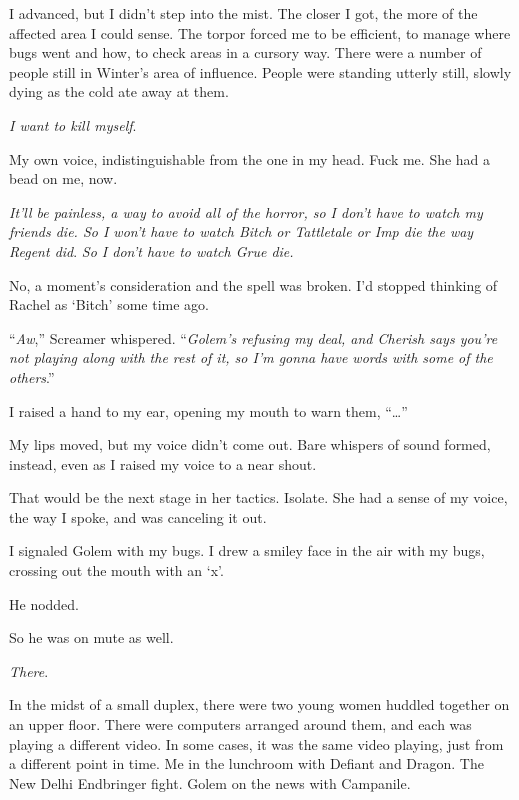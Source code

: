 I advanced, but I didn't step into the mist.  The closer I got, the more of the affected area I could sense.  The torpor forced me to be efficient, to manage where bugs went and how, to check areas in a cursory way.  There were a number of people still in Winter's area of influence.  People were standing utterly still, slowly dying as the cold ate away at them.



\emph{I want to kill myself}.



My own voice, indistinguishable from the one in my head.  Fuck me.  She had a bead on me, now.



\emph{It'll be painless, a way to avoid all of the horror, so I don't have to watch my friends die.  So I won't have to watch Bitch or Tattletale or Imp die the way Regent did}.  \emph{So I don't have to watch Grue die.}



No, a moment's consideration and the spell was broken.  I'd stopped thinking of Rachel as `Bitch' some time ago.



``\emph{Aw},'' Screamer whispered.  ``\emph{Golem's refusing my deal, and Cherish says you're not playing along with the rest of it, so I'm gonna have words with some of the others}.''



I raised a hand to my ear, opening my mouth to warn them, ``\ldots''



My lips moved, but my voice didn't come out.  Bare whispers of sound formed, instead, even as I raised my voice to a near shout.



That would be the next stage in her tactics.  Isolate.  She had a sense of my voice, the way I spoke, and was canceling it out.



I signaled Golem with my bugs.  I drew a smiley face in the air with my bugs, crossing out the mouth with an `x'.



He nodded.



So he was on mute as well.



\emph{There}.



In the midst of a small duplex, there were two young women huddled together on an upper floor.  There were computers arranged around them, and each was playing a different video.  In some cases, it was the same video playing, just from a different point in time.  Me in the lunchroom with Defiant and Dragon.  The New Delhi Endbringer fight.  Golem on the news with Campanile.



